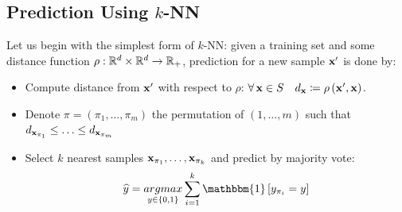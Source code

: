 \subsection{Prediction Using $k$-NN}
Let us begin with the simplest form of $k$-NN: given a training set \trainset and some distance function $\rho:\mathbb{R}^d\times\mathbb{R}^d\rightarrow\mathbb{R}_+$, prediction for a new sample $\mathbf{x}'$ is done by:
\begin{itemize}
	\item Compute distance from $\mathbf{x}'$ with respect to $\rho$: $\forall\, \mathbf{x}\in S\quad d_{\mathbf{x}}\coloneqq \rho\left(\mathbf{x}',\mathbf{x}\right)$.
	\item Denote $\pi=\left(\pi_1,\ldots,\pi_m\right)$ the permutation of $\left(1,\ldots,m\right)$ such that $d_{\mathbf{x}_{\pi_{1}}}\leq \ldots \leq d_{\mathbf{x}_{\pi_{m}}}$
	\item Select $k$ nearest samples $\mathbf{x}_{\pi_{1}},\ldots,\mathbf{x}_{\pi_k}$ and predict by majority vote: $$ \widehat{y}=\underset{y\in\left\{0,1\right\}}{argmax}\sum^k_{i=1}\mathbbm{1}\left[y_{\pi_i}=y\right] $$ 
\end{itemize}


